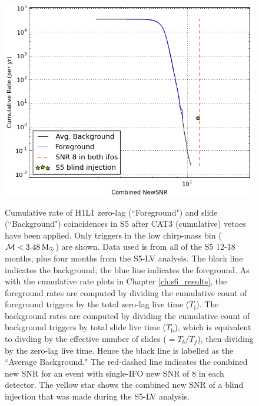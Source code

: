 \begin{figure}[p]
\center
\includegraphics[width=6in]{figures/ligo_south/Cat3-newsnr-low_mass.png}
\label{fig:ligo_south-cat3_newsnr}
\caption{Cumulative rate of H1L1 zero-lag (``Foreground") and slide
(``Background") coincidences in \ac{S5} after CAT3 (cumulative) vetoes have
been applied. Only triggers in the low chirp-mass bin ($\mathcal{M} < 3.48\,\mathrm{M_\odot}$)
are shown. Data used is from all of the \ac{S5} 12-18 months, plus four months
from the \ac{S5}-LV analysis. The black line indicates the background; the blue
line indicates the foreground. As with the cumulative rate plots in Chapter
\ref{ch:s6_results}, the foreground rates are computed by dividing the
cumulative count of foreground triggers by the total zero-lag live time
($T_{\mathrm{f}}$). The background rates are computed by dividing the
cumulative count of background triggers by total slide live time
($T_{\mathrm{b}}$), which is equivalent to divding by the effective number of
slides ($= T_{b}/T_{f}$), then dividing by the zero-lag live time. Hence the
black line is labelled as the ``Average Background." The red-dashed line
indicates the combined new \ac{SNR} for an event with single-\ac{IFO} new
\ac{SNR} of $8$ in each detector. The yellow star shows the combined new
\ac{SNR} of a blind injection that was made during the \ac{S5}-LV analysis.}
\end{figure}

